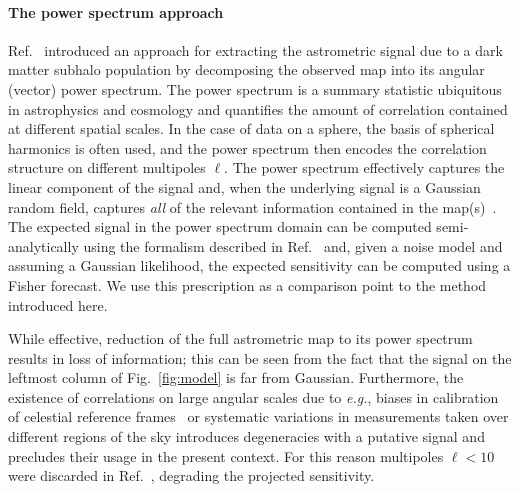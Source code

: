 \documentclass[preprint]{article}
\begin{document}
\paragraph{The power spectrum approach} Ref.~\cite{Mishra-Sharma:2020ynk} introduced an approach for extracting the astrometric signal due to a dark matter subhalo population by decomposing the observed map into its angular (vector) power spectrum. The power spectrum is a summary statistic ubiquitous in astrophysics and cosmology and quantifies the amount of correlation contained at different spatial scales. In the case of data on a sphere, the basis of spherical harmonics is often used, and the power spectrum then encodes the correlation structure on different multipoles $\ell$. The power spectrum effectively captures the linear component of the signal and, when the underlying signal is a Gaussian random field, captures \emph{all} of the relevant information contained in the map(s)~\cite{Tegmark:1996qt}.
The expected signal in the power spectrum domain can be computed semi-analytically using the formalism described in Ref.~\cite{Mishra-Sharma:2020ynk} and, given a noise model and assuming a Gaussian likelihood, the expected sensitivity can be computed using a Fisher forecast. We use this prescription as a comparison point to the method introduced here.

While effective, reduction of the full astrometric map to its power spectrum results in loss of information; this can be seen from the fact that the signal on the leftmost column of Fig.~\ref{fig:model} is far from Gaussian. Furthermore, the existence of correlations on large angular scales due to \emph{e.g.}, biases in calibration of celestial reference frames~\cite{2018A&A...616A..14G} or systematic variations in measurements taken over different regions of the sky introduces degeneracies with a putative signal and precludes their usage in the present context. For this reason multipoles $\ell < 10$ were discarded in Ref.~\cite{Mishra-Sharma:2020ynk}, degrading the projected sensitivity.
\end{document}
